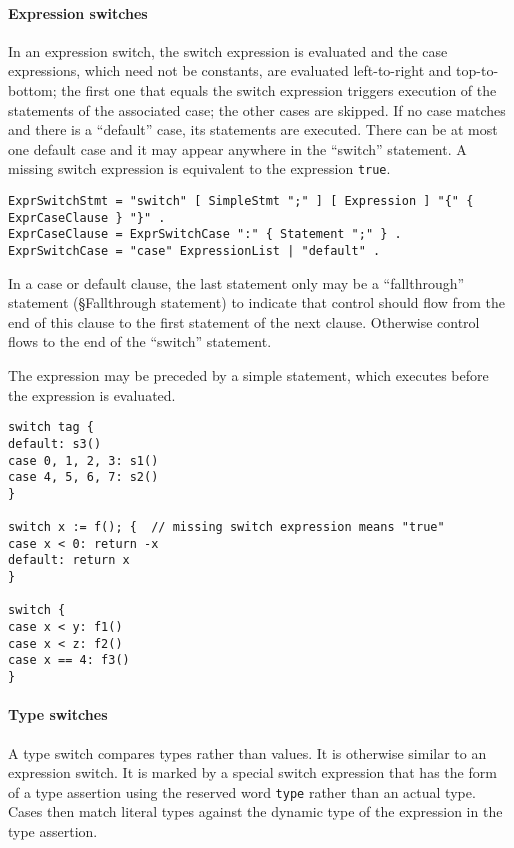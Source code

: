 \paragraph{Expression switches}

In an expression switch, the switch expression is evaluated and the case
expressions, which need not be constants, are evaluated left-to-right
and top-to-bottom; the first one that equals the switch expression
triggers execution of the statements of the associated case; the other
cases are skipped. If no case matches and there is a ``default'' case,
its statements are executed. There can be at most one default case and
it may appear anywhere in the ``switch'' statement. A missing switch
expression is equivalent to the expression \texttt{true}.

\begin{Verbatim}[frame=single]
ExprSwitchStmt = "switch" [ SimpleStmt ";" ] [ Expression ] "{" { ExprCaseClause } "}" .
ExprCaseClause = ExprSwitchCase ":" { Statement ";" } .
ExprSwitchCase = "case" ExpressionList | "default" .
\end{Verbatim}

In a case or default clause, the last statement only may be a
``fallthrough'' statement
(§Fallthrough statement) to indicate
that control should flow from the end of this clause to the first
statement of the next clause. Otherwise control flows to the end of the
``switch'' statement.

The expression may be preceded by a simple statement, which executes
before the expression is evaluated.

\begin{Verbatim}[frame=single]
switch tag {
default: s3()
case 0, 1, 2, 3: s1()
case 4, 5, 6, 7: s2()
}

switch x := f(); {  // missing switch expression means "true"
case x < 0: return -x
default: return x
}

switch {
case x < y: f1()
case x < z: f2()
case x == 4: f3()
}
\end{Verbatim}

\paragraph{Type switches}

A type switch compares types rather than values. It is otherwise similar
to an expression switch. It is marked by a special switch expression
that has the form of a type assertion using
the reserved word \texttt{type} rather than an actual type. Cases then
match literal types against the dynamic type of the expression in the
type assertion.

